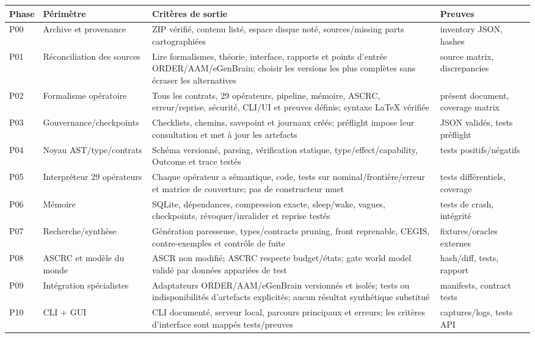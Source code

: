 \documentclass[10pt,a4paper]{article}
\begin{document}
\begingroup\footnotesize\sloppy
\setlength{\tabcolsep}{3pt}
\begin{longtable}{L{0.07\textwidth}L{0.21\textwidth}L{0.40\textwidth}L{0.21\textwidth}}
\toprule Phase & Périmètre & Critères de sortie & Preuves \\
\midrule
P00 & Archive et provenance & ZIP vérifié, contenu listé, espace disque noté, sources/missing parts cartographiées & inventory JSON, hashes \\
P01 & Réconciliation des sources & Lire formalismes, théorie, interface, rapports et points d'entrée ORDER/AAM/eGenBrain; choisir les versions les plus complètes sans écraser les alternatives & source matrix, discrepancies \\
P02 & Formalisme opératoire & Tous les contrats, 29 opérateurs, pipeline, mémoire, ASCRC, erreur/reprise, sécurité, CLI/UI et preuves définis; syntaxe LaTeX vérifiée & présent document, coverage matrix \\
P03 & Gouvernance/checkpoints & Checklists, chemins, savepoint et journaux créés; préflight impose leur consultation et met à jour les artefacts & JSON validés, tests préflight \\
P04 & Noyau AST/type/contrats & Schéma versionné, parsing, vérification statique, type/effect/capability, Outcome et trace testés & tests positifs/négatifs \\
P05 & Interpréteur 29 opérateurs & Chaque opérateur a sémantique, code, tests sur nominal/frontière/erreur et matrice de couverture; pas de constructeur muet & tests différentiels, coverage \\
P06 & Mémoire & SQLite, dépendances, compression exacte, sleep/wake, vagues, checkpoints, révoquer/invalider et reprise testés & tests de crash, intégrité \\
P07 & Recherche/synthèse & Génération paresseuse, types/contracts pruning, front reprenable, CEGIS, contre-exemples et contrôle de fuite & fixtures/oracles externes \\
P08 & ASCRC et modèle du monde & ASCR non modifié; ASCRC respecte budget/états; gate world model validé par données appariées de test & hash/diff, tests, rapport \\
P09 & Intégration spécialistes & Adaptateurs ORDER/AAM/eGenBrain versionnés et isolés; tests ou indisponibilités d'artefacts explicités; aucun résultat synthétique substitué & manifests, contract tests \\
P10 & CLI + GUI & CLI documenté, serveur local, parcours principaux et erreurs; les critères d'interface sont mappés tests/preuves & captures/logs, tests API \\

\end{longtable}
\end{document}
